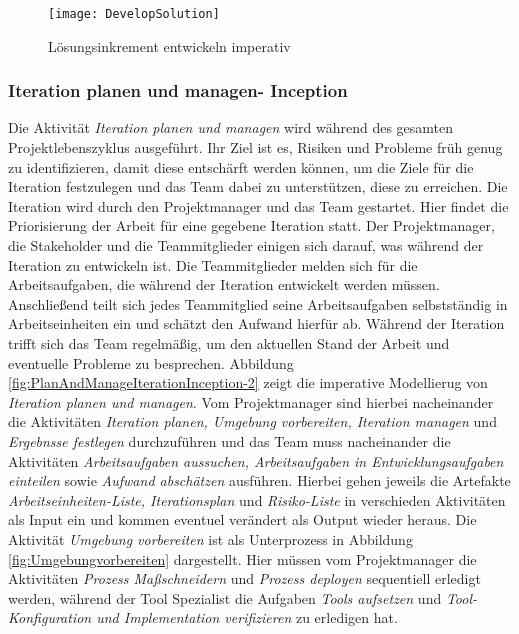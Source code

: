  
\begin{figure}[htp]
\begin{center}
  \texttt{[image: DevelopSolution]} %
  \caption{Lösungsinkrement entwickeln imperativ}
  \label{fig:Develop}
\end{center}
\end{figure}

\subsubsection{Iteration planen und managen- Inception}

Die Aktivität \textit{Iteration planen und managen} wird während des gesamten Projektlebenszyklus ausgeführt. Ihr Ziel ist es, Risiken und Probleme früh genug zu identifizieren, damit diese entschärft werden können, um die Ziele für die Iteration festzulegen und das Team dabei zu unterstützen, diese zu erreichen.\newline
Die Iteration wird durch den Projektmanager und das Team gestartet. Hier findet die Priorisierung der Arbeit für eine gegebene Iteration statt. Der Projektmanager, die Stakeholder und die Teammitglieder einigen sich darauf, was während der Iteration zu entwickeln ist.\newline
Die Teammitglieder melden sich für die Arbeitsaufgaben, die während der Iteration entwickelt werden müssen. Anschließend teilt sich jedes Teammitglied seine Arbeitsaufgaben selbstständig in Arbeitseinheiten ein und schätzt den Aufwand hierfür ab.\newline
Während der Iteration trifft sich das Team regelmäßig, um den aktuellen Stand der Arbeit und eventuelle Probleme zu besprechen. \newline
Abbildung \ref{fig:PlanAndManageIterationInception-2} zeigt die imperative Modellierug von \textit{Iteration planen und managen}. \newline
Vom Projektmanager sind hierbei nacheinander die Aktivitäten \textit{Iteration planen, Umgebung vorbereiten, Iteration managen} und \textit{Ergebnsse festlegen} durchzuführen und das Team muss nacheinander die Aktivitäten \textit{Arbeitsaufgaben aussuchen, Arbeitsaufgaben in Entwicklungsaufgaben einteilen} sowie \textit{Aufwand abschätzen} ausführen. Hierbei gehen jeweils die Artefakte \textit{Arbeitseinheiten-Liste, Iterationsplan} und \textit{Risiko-Liste} in verschieden Aktivitäten als Input ein und kommen eventuel verändert als Output wieder heraus. \newline
Die Aktivität \textit{Umgebung vorbereiten} ist als Unterprozess in Abbildung \ref{fig:Umgebungvorbereiten} dargestellt. Hier müssen vom Projektmanager die Aktivitäten \textit{Prozess Maßschneidern} und \textit{Prozess deployen} sequentiell erledigt werden, während der Tool Spezialist die Aufgaben \textit{Tools aufsetzen} und \textit{Tool-Konfiguration und Implementation verifizieren} zu erledigen hat.


